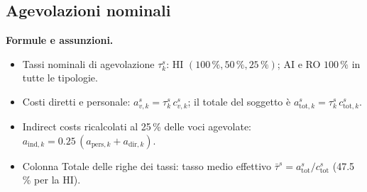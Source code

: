 \documentclass{plan4ari_report}
\begin{document}
\subsection{Agevolazioni nominali}
\textbf{Formule e assunzioni.}
\begin{itemize}
  \item Tassi nominali di agevolazione $\tau^{s}_k$: HI $(100\,\%, 50\,\%, 25\,\%)$; AI e RO $100\,\%$ in tutte le tipologie.
  \item Costi diretti e personale: $a^{s}_{v,k} = \tau^{s}_k\, c^{s}_{v,k}$; il totale del soggetto \`e $a^{s}_{\mathrm{tot},k} = \tau^{s}_k\, c^{s}_{\mathrm{tot},k}$.
  \item Indirect costs ricalcolati al 25\,\% delle voci agevolate: $a_{\mathrm{ind},k} = 0.25\,(a_{\mathrm{pers},k} + a_{\mathrm{dir},k})$.
  \item Colonna Totale delle righe dei tassi: tasso medio effettivo $\bar\tau^{s} = a^{s}_{\mathrm{tot}}/c^{s}_{\mathrm{tot}}$ (47.5\,\% per la HI).
\end{itemize}
\end{document}
